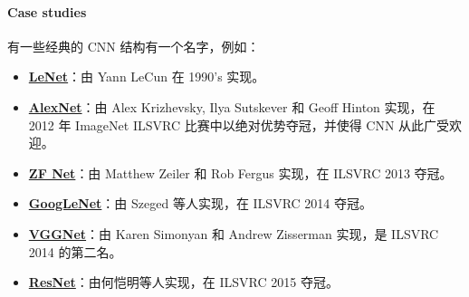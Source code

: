 \paragraph{Case studies}

有一些经典的 CNN 结构有一个名字，例如：

\begin{itemize}
    \item \href{http://yann.lecun.com/exdb/publis/pdf/lecun-98.pdf}{\textbf{LeNet}}：由 Yann LeCun 在 1990's 实现。
    \item \href{https://proceedings.neurips.cc/paper/2012/file/c399862d3b9d6b76c8436e924a68c45b-Paper.pdf}{\textbf{AlexNet}}：由 Alex Krizhevsky, Ilya Sutskever 和 Geoff Hinton 实现，在 2012 年 ImageNet ILSVRC 比赛中以绝对优势夺冠，并使得 CNN 从此广受欢迎。
    \item \href{https://arxiv.org/abs/1311.2901}{\textbf{ZF Net}}：由 Matthew Zeiler 和 Rob Fergus 实现，在 ILSVRC 2013 夺冠。
    \item \href{https://arxiv.org/abs/1409.4842}{\textbf{GoogLeNet}}：由 Szeged 等人实现，在 ILSVRC 2014 夺冠。
    \item \href{https://arxiv.org/abs/1409.1556}{\textbf{VGGNet}}：由 Karen Simonyan 和 Andrew Zisserman 实现，是 ILSVRC 2014 的第二名。
    \item \href{https://arxiv.org/abs/1512.03385}{\textbf{ResNet}}：由何恺明等人实现，在 ILSVRC 2015 夺冠。

\end{itemize}
